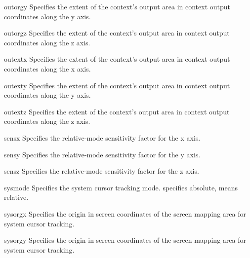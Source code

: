 \begin{memberdesc}{outorgy}
Specifies the extent of the context's output area in context output
coordinates along the y axis.
\end{memberdesc}

\begin{memberdesc}{outorgz}
Specifies the extent of the context's output area in context output
coordinates along the z axis.
\end{memberdesc}

\begin{memberdesc}{outextx}
Specifies the extent of the context's output area in context output
coordinates along the x axis.
\end{memberdesc}

\begin{memberdesc}{outexty}
Specifies the extent of the context's output area in context output
coordinates along the y axis.
\end{memberdesc}

\begin{memberdesc}{outextz}
Specifies the extent of the context's output area in context output
coordinates along the z axis.
\end{memberdesc}

\begin{memberdesc}{sensx}
Specifies the relative-mode sensitivity factor for the x axis.
\end{memberdesc}

\begin{memberdesc}{sensy}
Specifies the relative-mode sensitivity factor for the y axis.
\end{memberdesc}

\begin{memberdesc}{sensz}
Specifies the relative-mode sensitivity factor for the z axis.
\end{memberdesc}

\begin{memberdesc}{sysmode}
Specifies the system cursor tracking mode.  specifies absolute,
 means relative.
\end{memberdesc}

\begin{memberdesc}{sysorgx}
Specifies the origin in screen coordinates of the screen mapping area
for system cursor tracking.
\end{memberdesc}

\begin{memberdesc}{sysorgy}
Specifies the origin in screen coordinates of the screen mapping area
for system cursor tracking.
\end{memberdesc}

